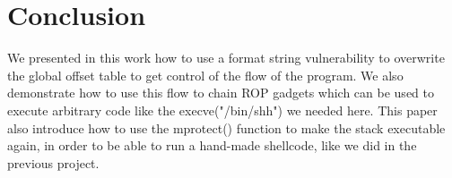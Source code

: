 \section{Conclusion}
We presented in this work how to use a format string vulnerability to overwrite the global offset table to get control of the flow of the program. We also demonstrate how to use this flow to chain ROP gadgets which can be used to execute arbitrary code like the execve("/bin/shh") we needed here.
This paper also introduce how to use the mprotect() function to make the stack executable again, in order to be able to run a hand-made shellcode, like we did in the previous project.
